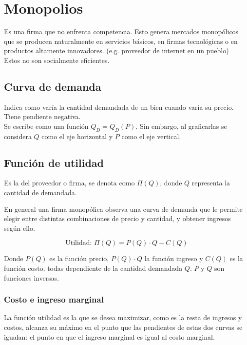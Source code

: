 \section{Monopolios}

Es una firma que no enfrenta competencia. Esto genera mercados monopólicos que se producen naturalmente en servicios básicos, en firmas tecnológicas o en productos altamente innovadores. (e.g. proveedor de internet en un pueblo)\\

Estos no son socialmente eficientes.
\subsection{Curva de demanda}
Indica como varía la cantidad demandada de un bien cuando varía su precio. Tiene pendiente negativa.\\

Se escribe como una función $Q_D = Q_D(P)$. Sin embargo, al graficarlas se considera $Q$ como el eje horizontal y $P$ como el eje vertical.\\

\subsection{Función de utilidad}
Es la del proveedor o firma, se denota como $\Pi(Q)$, donde $Q$ representa la cantidad de demandada.

En general una firma monopólica observa una curva de demanda que le permite elegir entre distintas combinaciones de precio y cantidad, y obtener ingresos según ello.

\[\text{Utilidad:  } \Pi(Q) = P(Q)\cdot Q - C(Q) \]

Donde $P(Q)$ es la función precio, $P(Q)\cdot Q$ la función ingreso y $C(Q)$ es la función costo, todas dependiente de la cantidad demandada $Q$.
\newline $P$ y $Q$ son funciones inversas.\\

\subsubsection{Costo e ingreso marginal}
La función utilidad es la que se desea maximizar, como es la resta de ingresos y costos, alcanza su máximo en el punto que las pendientes de estas dos curvas se igualan: el punto en que el ingreso marginal es igual al costo marginal.\\

